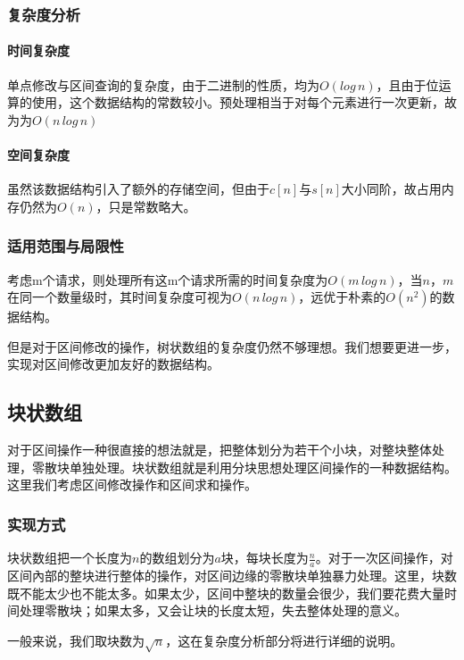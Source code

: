 \documentclass{cjc}
\begin{document}
\subsubsection{复杂度分析}
\paragraph{时间复杂度} 单点修改与区间查询的复杂度，由于二进制的性质，均为$O(log\,n)$，且由于位运算的使用，这个数据结构的常数较小。预处理相当于对每个元素进行一次更新，故为为$O(n\,log\,n)$
\paragraph{空间复杂度} 虽然该数据结构引入了额外的存储空间，但由于$c[n]$与$s[n]$大小同阶，故占用内存仍然为$O(n)$，只是常数略大。
\subsubsection{适用范围与局限性}
考虑m个请求，则处理所有这m个请求所需的时间复杂度为$O(m\,log\,n)$，当$n$，$m$在同一个数量级时，其时间复杂度可视为$O(n\,log\,n)$，远优于朴素的$O(n^2)$的数据结构。

但是对于区间修改的操作，树状数组的复杂度仍然不够理想。我们想要更进一步，实现对区间修改更加友好的数据结构。

\subsection{块状数组}
对于区间操作一种很直接的想法就是，把整体划分为若干个小块，对整块整体处理，零散块单独处理。块状数组就是利用分块思想处理区间操作的一种数据结构。这里我们考虑区间修改操作和区间求和操作。

\subsubsection{实现方式}
块状数组把一个长度为$n$的数组划分为$a$块，每块长度为$\frac{n}{a}$。对于一次区间操作，对区间內部的整块进行整体的操作，对区间边缘的零散块单独暴力处理。这里，块数既不能太少也不能太多。如果太少，区间中整块的数量会很少，我们要花费大量时间处理零散块；如果太多，又会让块的长度太短，失去整体处理的意义。

一般来说，我们取块数为$\sqrt{n}$，这在复杂度分析部分将进行详细的说明。
\end{document}
